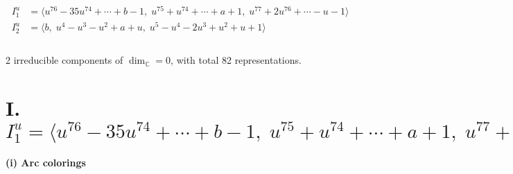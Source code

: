 \documentclass[1p]{elsarticle_modified}
\theoremstyle{definition}
\begin{document}
\begin{align*}
I^u_{1}&=\langle 
u^{76}-35 u^{74}+\cdots+b-1,\;u^{75}+u^{74}+\cdots+a+1,\;u^{77}+2 u^{76}+\cdots- u-1\rangle \\
I^u_{2}&=\langle 
b,\;u^4- u^3- u^2+a+u,\;u^5- u^4-2 u^3+u^2+u+1\rangle \\
\\
\end{align*}
\raggedright * 2 irreducible components of $\dim_{\mathbb{C}}=0$, with total 82 representations.\\
\newpage
\renewcommand{\arraystretch}{1}
\centering \section*{I. $I^u_{1}= \langle u^{76}-35 u^{74}+\cdots+b-1,\;u^{75}+u^{74}+\cdots+a+1,\;u^{77}+2 u^{76}+\cdots- u-1 \rangle$}
\flushleft \textbf{(i) Arc colorings}\\
\end{document}
